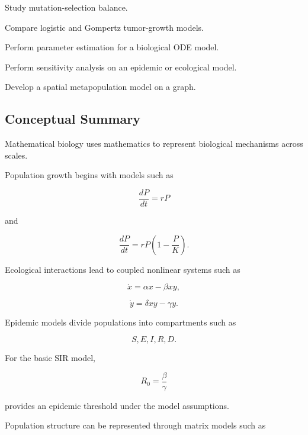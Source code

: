 \begin{exercise}[4]
Study mutation-selection balance.
\end{exercise}

\begin{exercise}[4]
Compare logistic and Gompertz tumor-growth models.
\end{exercise}

\begin{exercise}[4]
Perform parameter estimation for a biological ODE model.
\end{exercise}

\begin{exercise}[4]
Perform sensitivity analysis on an epidemic or ecological model.
\end{exercise}

\begin{exercise}[4]
Develop a spatial metapopulation model on a graph.
\end{exercise}

\subsection{Conceptual Summary}
\label{subsec:mathematical-biology-summary}

Mathematical biology uses mathematics to represent biological mechanisms
across scales.

Population growth begins with models such as

\[
\boxed{
\frac{dP}{dt}=rP
}
\]

and

\[
\boxed{
\frac{dP}{dt}
=
rP
\left(
1-\frac{P}{K}
\right).
}
\]

Ecological interactions lead to coupled nonlinear systems such as

\[
\boxed{
\dot{x}
=
\alpha x-\beta xy,
}
\]

\[
\boxed{
\dot{y}
=
\delta xy-\gamma y.
}
\]

Epidemic models divide populations into compartments such as

\[
\boxed{
S,
E,
I,
R,
D.
}
\]

For the basic SIR model,

\[
\boxed{
R_0
=
\frac{\beta}{\gamma}
}
\]

provides an epidemic threshold under the model assumptions.

Population structure can be represented through matrix models such as

